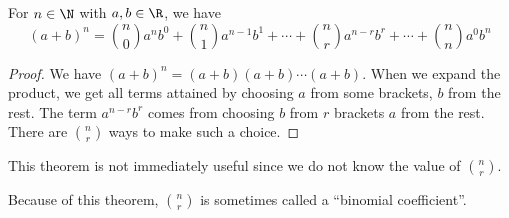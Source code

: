 \documentclass[a4paper]{article}
\begin{document}
  \begin{thm}
    For $n\in \N$ with $a, b\in \R$, we have
    \[
      (a + b)^n = \binom{n}{0}a^n b^0 + \binom{n}{1}a^{n-1}b^1 + \cdots + \binom{n}{r}a^{n - r}b^r + \cdots + \binom{n}{n}a^0b^n
    \]
  \end{thm}

  \begin{proof}
    We have $(a + b)^n = (a + b)(a + b)\cdots (a + b)$. When we expand the product, we get all terms attained by choosing $a$ from some brackets, $b$ from the rest. The term $a^{n - r}b^r$ comes from choosing $b$ from $r$ brackets $a$ from the rest. There are $\binom{n}{r}$ ways to make such a choice.
  \end{proof}
  \note This theorem is not immediately useful since we do not know the value of $\binom{n }{r}$.

  Because of this theorem, $\binom{n }{r}$ is sometimes called a ``binomial coefficient''.
\end{document}
